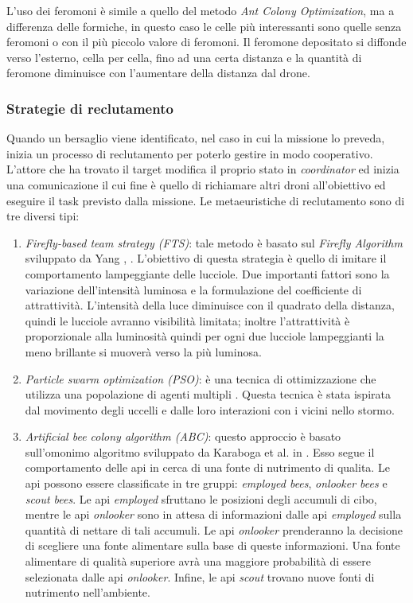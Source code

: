 L'uso dei feromoni è simile a quello del metodo \textit{Ant Colony Optimization}, ma a differenza delle formiche, in questo caso le celle più interessanti sono quelle senza feromoni o con il più piccolo valore di feromoni. 
Il feromone depositato si diffonde verso l'esterno, cella per cella, fino ad una certa distanza  e la quantità di feromone diminuisce con l'aumentare della distanza dal drone.


\subsubsection{Strategie di reclutamento}

Quando un bersaglio viene identificato, nel caso in cui la missione lo preveda, inizia un processo di reclutamento per poterlo gestire in modo cooperativo.
L'attore che ha trovato il target modifica il proprio stato in \textit{coordinator} ed inizia una comunicazione il cui fine è quello di richiamare altri droni all'obiettivo ed eseguire il task previsto dalla missione. 
Le metaeuristiche di reclutamento sono di tre diversi tipi:

\begin{enumerate}
    \item \textit{Firefly-based team strategy (FTS)}: tale metodo è basato sul \textit{Firefly Algorithm} sviluppato da Yang \cite{yang2009firefly}, \cite{yang2010firefly}. 
    L'obiettivo di questa strategia è quello di imitare il comportamento lampeggiante delle lucciole.
    Due importanti fattori sono la variazione dell’intensità luminosa e la formulazione del coefficiente di attrattività. 
    L’intensità della luce diminuisce con il quadrato della distanza, quindi le lucciole avranno visibilità limitata; inoltre l’attrattività è proporzionale alla luminosità quindi per ogni due lucciole lampeggianti la meno brillante si muoverà verso la più luminosa.
    \item \textit{Particle swarm optimization (PSO)}: è una tecnica di ottimizzazione che utilizza una popolazione di agenti multipli \cite{eberhart1995particle}.
    Questa tecnica è stata ispirata dal movimento degli uccelli e dalle loro interazioni con i vicini nello stormo.
    \item \textit{Artificial bee colony algorithm (ABC)}: questo approccio è basato sull'omonimo algoritmo sviluppato da Karaboga et al. in \cite{karaboga2009comparative}.
    Esso segue il comportamento delle api in cerca di una fonte di nutrimento di qualita. Le api possono essere classificate in tre gruppi: \textit{employed bees}, \textit{onlooker bees} e \textit{scout bees}. 
    Le api \textit{employed} sfruttano le posizioni degli accumuli di cibo, mentre le api \textit{onlooker} sono in attesa di informazioni dalle api \textit{employed} sulla quantità di nettare di tali accumuli. 
    Le api \textit{onlooker} prenderanno la decisione di scegliere una fonte alimentare sulla base di queste informazioni.
    Una fonte alimentare di qualità superiore avrà una maggiore probabilità di essere selezionata dalle api \textit{onlooker}. Infine, le api \textit{scout} trovano nuove fonti di nutrimento nell'ambiente.
\end{enumerate}